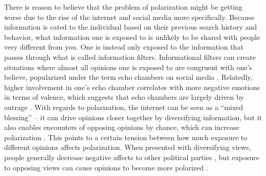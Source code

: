 \documentclass{article}
\begin{document}
There is reason to believe that the problem of polarization might be getting worse due to the rise of the internet and social media more specifically. Because information is cated to the individual based on their previous search history and behavior, what information one is exposed to is unlikely to be shared with people very different from you. One is instead only exposed to the information that passes through what is called information filters. Informational filters can create situations where almost all opinions one is exposed to are congruent with one’s believe, popularized under the term echo chambers on social media \cite{baumann_modeling_2020, sasahara_social_2021, tsai_echo_2020}. Relatedly, higher involvement in one’s echo chamber correlates with more negative emotions in terms of valence, which suggests that echo chambers are largely driven by outrage \cite{del_vicario_echo_2016}. With regards to polarization, the internet can be seen as a “mixed blessing” – it can drive opinions closer together by diversifying information, but it also enables encounters of opposing opinions by chance, which can increase polarization \cite{lev-on_happy_2009}. This points to a certain tension between how much exposure to different opinions affects polarization. When presented with diversifying views, people generally decrease negative affects to other political parties \cite{levy_social_2021}, but exposure to opposing views can cause opinions to become more polarized \cite{bail_exposure_2018}. 
\end{document}
